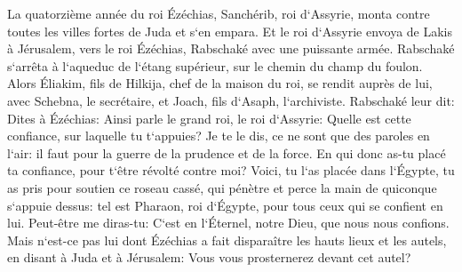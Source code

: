 \verse La quatorzième année du roi Ézéchias, Sanchérib, roi d`Assyrie, monta contre toutes les villes fortes de Juda et s`en empara. 
\verse Et le roi d`Assyrie envoya de Lakis à Jérusalem, vers le roi Ézéchias, Rabschaké avec une puissante armée. Rabschaké s`arrêta à l`aqueduc de l`étang supérieur, sur le chemin du champ du foulon. 
\verse Alors Éliakim, fils de Hilkija, chef de la maison du roi, se rendit auprès de lui, avec Schebna, le secrétaire, et Joach, fils d`Asaph, l`archiviste. 
\verse Rabschaké leur dit: Dites à Ézéchias: Ainsi parle le grand roi, le roi d`Assyrie: Quelle est cette confiance, sur laquelle tu t`appuies? 
\verse Je te le dis, ce ne sont que des paroles en l`air: il faut pour la guerre de la prudence et de la force. En qui donc as-tu placé ta confiance, pour t`être révolté contre moi? 
\verse Voici, tu l`as placée dans l`Égypte, tu as pris pour soutien ce roseau cassé, qui pénètre et perce la main de quiconque s`appuie dessus: tel est Pharaon, roi d`Égypte, pour tous ceux qui se confient en lui. 
\verse Peut-être me diras-tu: C`est en l`Éternel, notre Dieu, que nous nous confions. Mais n`est-ce pas lui dont Ézéchias a fait disparaître les hauts lieux et les autels, en disant à Juda et à Jérusalem: Vous vous prosternerez devant cet autel? 
